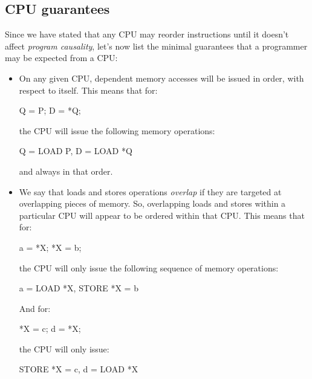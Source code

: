 \subsection{CPU guarantees\label{sec:mem_barr_CPU_guar}}

Since we have stated that any CPU may reorder instructions until it doesn't affect
\emph{program causality}, let's now list the minimal guarantees that a programmer
may be expected from a CPU:

\begin{itemize}

\item On any given CPU, dependent memory accesses will be issued in order, with
respect to itself. This means that for:

\begin{center}
Q = P; D = *Q;
\end{center}

the CPU will issue the following memory operations:

\begin{center}
Q = LOAD P, D = LOAD *Q
\end{center}

and always in that order.

\item We say that loads and stores operations \emph{overlap} if they are targeted at
overlapping pieces of memory. So, overlapping loads and stores within a particular 
CPU will appear to be ordered within that CPU. This means that for:

\begin{center}
a = *X; *X = b;
\end{center}

the CPU will only issue the following sequence of memory operations:

\begin{center}
a = LOAD *X, STORE *X = b
\end{center}

And for:

\begin{center}
*X = c; d = *X;
\end{center}

the CPU will only issue:

\begin{center}
STORE *X = c, d = LOAD *X
\end{center}

\end{itemize}

